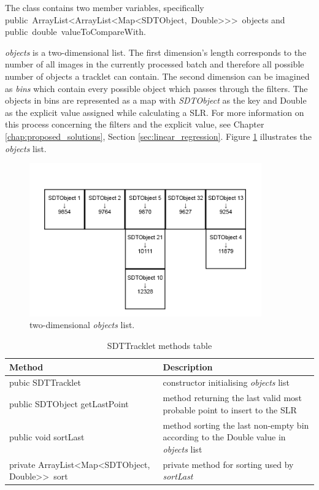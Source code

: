 	The class contains two member variables, specifically \newline \mbox{public ArrayList<ArrayList<Map<SDTObject, Double>{}>{}> objects} \newline and \mbox{public double valueToCompareWith}.
	
	\emph{objects} is a two-dimensional list. The first dimension's length corresponds to the number of all images in the currently processed batch and therefore all possible number of objects a tracklet can contain. The second dimension can be imagined as \emph{bins} which contain every possible object which passes through the filters. The objects in bins are represented as a map with \emph{SDTObject} as the key and Double as the explicit value assigned while calculating a SLR. For more information on this process concerning the filters and the explicit value, see Chapter \ref{chap:proposed_solutions}, Section \ref{sec:linear_regression}. Figure \ref{fig:2dbins} illustrates the \emph{objects} list.
	
	\begin{figure}[H]
	\centering
	  \includegraphics[width=10cm]{images/2dbins}
		  \caption{two-dimensional \emph{objects} list.}
	  \label{fig:2dbins}
	\end{figure}

\begin{table}[H]
\centering
\setlength{\extrarowheight}{2pt}
\begin{tabularx}{\textwidth}{|X|X|}
\hline
\textbf{Method} & \textbf{Description} \\ \hline
pubic \mbox{SDTTracklet} & constructor initialising \emph{objects} list \\ \hline
public SDTObject \mbox{getLastPoint} & method returning the last valid most probable point to insert to the SLR \\ \hline
public void \mbox{sortLast} & method sorting the last non-empty bin according to the Double value in \emph{objects} list \\ \hline
private \mbox{ArrayList<Map<SDTObject,} \mbox{Double>{}> sort} & private method for sorting used by \emph{sortLast} \\ \hline
\end{tabularx}
\caption{SDTTracklet methods table}
\label{tab:class_methods_T}
\end{table}

